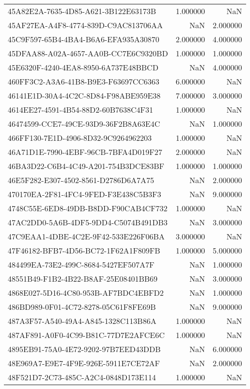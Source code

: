 \begin{tabular}{lrr}
45A82E2A-7635-4D85-A621-3B122E63173B & 1.000000 & NaN \\
45AF27EA-A4F8-4774-839D-C9AC813706AA & NaN & 2.000000 \\
45C9F597-65B4-4BA4-B6A6-EFA935A30870 & 2.000000 & 4.000000 \\
45DFAA88-A02A-4657-AA0B-CC7E6C9320BD & 1.000000 & 1.000000 \\
45E6320F-4240-4EA8-8950-6A737E48BBCD & NaN & 4.000000 \\
460FF3C2-A3A6-41B8-B9E3-F63697CC6363 & 6.000000 & NaN \\
46141E1D-30A4-4C2C-8D84-F98ABE959E38 & 7.000000 & 3.000000 \\
4614EE27-4591-4B54-88D2-60B7638C4F31 & 1.000000 & NaN \\
46474599-CCE7-49CE-93D9-36F2B8A63E4C & NaN & 1.000000 \\
466FF130-7E1D-4906-8D32-9C9264962203 & 1.000000 & NaN \\
46A71D1E-7990-4EBF-96CB-7BFA4D019F27 & 2.000000 & NaN \\
46BA3D22-C6B4-4C49-A201-754B3DCE83BF & 1.000000 & 1.000000 \\
46E5F282-E307-4502-8561-D2786D6A7A75 & NaN & 2.000000 \\
470170EA-2F81-4FC4-9FED-F3E438C5B3F3 & NaN & 9.000000 \\
4748C55E-6ED8-49DB-B8DD-F90CAB4CF732 & 1.000000 & NaN \\
47AC2DD0-5A6B-4DF5-9DD4-C5074B491DB3 & NaN & 3.000000 \\
47C9EAA1-4DBE-4C2E-9F42-533E226F06BA & 3.000000 & NaN \\
47F46182-BFB7-4D56-BC72-1F62A1F809FB & 1.000000 & 5.000000 \\
484499EA-73E2-499C-8684-5427EF507A7F & NaN & 1.000000 \\
48551B49-F1B2-4B22-B8AF-25E08401BB69 & NaN & 3.000000 \\
4868E027-5D16-4C80-953B-AF7BDC4EBFD2 & NaN & 1.000000 \\
486BD989-0F01-4C72-8278-05C61F8FE69B & NaN & 9.000000 \\
487A3F57-A540-49A4-A845-1328C113B86A & 1.000000 & NaN \\
487AF891-A0F0-4C99-B81C-77D7E2AFCE6C & 1.000000 & NaN \\
4895EB91-75A0-4E72-9202-97B7EED43DDB & NaN & 6.000000 \\
48E969A7-E9E7-4F9E-926E-5911E7CE72AF & NaN & 2.000000 \\
48F521D7-2C73-485C-A2C4-0848D173E114 & 1.000000 & NaN \\

\end{tabular}
